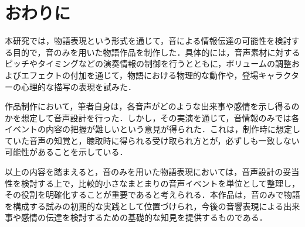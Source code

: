
\section{おわりに}

本研究では，物語表現という形式を通じて，音による情報伝達の可能性を検討する目的で，音のみを用いた物語作品を制作した．具体的には，音声素材に対するピッチやタイミングなどの演奏情報の制御を行うとともに，ボリュームの調整およびエフェクトの付加を通じて，物語における物理的な動作や，登場キャラクターの心理的な描写の表現を試みた．

作品制作において，筆者自身は，各音声がどのような出来事や感情を示し得るのかを想定して音声設計を行った．しかし，その実演を通じて，音情報のみでは各イベントの内容の把握が難しいという意見が得られた．これは，制作時に想定していた音声の知覚と，聴取時に得られる受け取られ方とが，必ずしも一致しない可能性があることを示している．

以上の内容を踏まえると，音のみを用いた物語表現においては，音声設計の妥当性を検討する上で，比較的小さなまとまりの音声イベントを単位として整理し，その役割を明確化することが重要であると考えられる．本作品は，音のみで物語を構成する試みの初期的な実践として位置づけられ，今後の音響表現による出来事や感情の伝達を検討するための基礎的な知見を提供するものである．